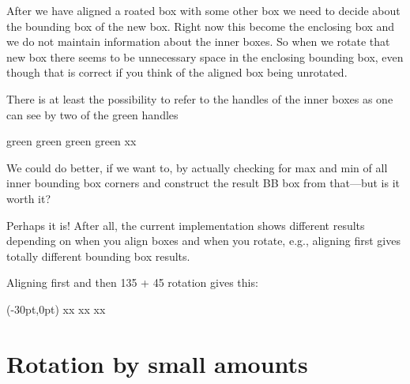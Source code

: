 \documentclass{article}
\newcommand\cbox[2][.8]{{\setlength\fboxsep{0pt}\colorbox[gray]{#1}{#2}}}
\begin{document}
After we have aligned a roated box with some other box we need to decide about
the bounding box of the new box. Right now this become the enclosing box and
we do not maintain information about the inner boxes. So when we rotate that
new box there seems to be unnecessary space in the enclosing bounding box,
even though that is correct if you think of the aligned box being unrotated.

There is at least the possibility to refer to the handles of the inner boxes
as one can see by two of the green handles

\medskip

\rotatecoffin {}
\displaycoffinhandle {} {green}
\displaycoffinhandle {} {green}
\displaycoffinhandle {} {green}
\displaycoffinhandle {} {green}
x\cbox{\usebox \aaa }x

We could do better, if we want to, by actually checking for max and
min of all inner bounding box corners and construct the result BB box from
that---but is it worth it?

Perhaps it is! After all, the current implementation shows different results
depending on when you align boxes and when you rotate, e.g., aligning first
gives totally different bounding box results.

\newpage

Aligning first and then 135 + 45 rotation gives this:

\sbox {}
\sbox {}
\rotatecoffin {}

\aligncoffins \aaa [b,l] \bbb[B,hc](-30pt,0pt)
x\cbox{\usebox \aaa }x
\qquad
\rotatecoffin {}
x\cbox{\usebox \aaa }x
\qquad
\rotatecoffin {}
x\cbox{\usebox \aaa }x




\newpage

\section{Rotation by small amounts}
\end{document}
